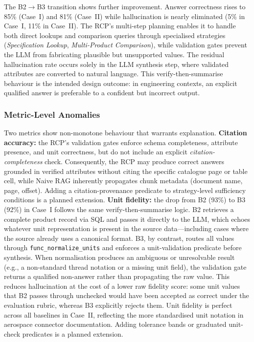 \documentclass[largeformat]{interact}
\begin{document}
The B2$\rightarrow$B3 transition shows further improvement. Answer correctness rises to 85\% (Case~I) and 81\% (Case~II) while hallucination is nearly eliminated (5\% in Case~I, 11\% in Case~II). The RCP's multi-step planning enables it to handle both direct lookups and comparison queries through specialised strategies (\emph{Specification Lookup}, \emph{Multi-Product Comparison}), while validation gates prevent the LLM from fabricating plausible but unsupported values. The residual hallucination rate occurs solely in the LLM synthesis step, where validated attributes are converted to natural language. This verify-then-summarise behaviour is the intended design outcome: in engineering contexts, an explicit qualified answer is preferable to a confident but incorrect output.

\subsubsection{Metric-Level Anomalies}
\label{subsubsection:metric_anomalies}
Two metrics show non-monotone behaviour that warrants explanation. \textbf{Citation accuracy:} the RCP's validation gates enforce schema completeness, attribute presence, and unit correctness, but do not include an explicit \emph{citation-completeness} check. Consequently, the RCP may produce correct answers grounded in verified attributes without citing the specific catalogue page or table cell, while Naive RAG inherently propagates chunk metadata (document name, page, offset). Adding a citation-provenance predicate to strategy-level sufficiency conditions is a planned extension. \textbf{Unit fidelity:} the drop from B2 (93\%) to B3 (92\%) in Case~I follows the same verify-then-summarise logic. B2 retrieves a complete product record via SQL and passes it directly to the LLM, which echoes whatever unit representation is present in the source data---including cases where the source already uses a canonical format. B3, by contrast, routes all values through \texttt{func\_normalize\_units} and enforces a unit-validation predicate before synthesis. When normalisation produces an ambiguous or unresolvable result (e.g., a non-standard thread notation or a missing unit field), the validation gate returns a qualified non-answer rather than propagating the raw value. This reduces hallucination at the cost of a lower raw fidelity score: some unit values that B2 passes through unchecked would have been accepted as correct under the evaluation rubric, whereas B3 explicitly rejects them. Unit fidelity is perfect across all baselines in Case~II, reflecting the more standardised unit notation in aerospace connector documentation. Adding tolerance bands or graduated unit-check predicates is a planned extension.
\end{document}
